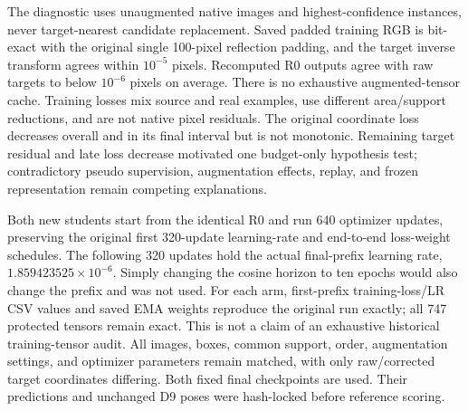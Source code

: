 The diagnostic uses unaugmented native images and highest-confidence instances, never target-nearest candidate replacement. Saved padded training RGB is bit-exact with the original single 100-pixel reflection padding, and the target inverse transform agrees within $10^{-5}$ pixels. Recomputed R0 outputs agree with raw targets to below $10^{-6}$ pixels on average. There is no exhaustive augmented-tensor cache. Training losses mix source and real examples, use different area/support reductions, and are not native pixel residuals. The original coordinate loss decreases overall and in its final interval but is not monotonic. Remaining target residual and late loss decrease motivated one budget-only hypothesis test; contradictory pseudo supervision, augmentation effects, replay, and frozen representation remain competing explanations.

Both new students start from the identical R0 and run 640 optimizer updates, preserving the original first 320-update learning-rate and end-to-end loss-weight schedules. The following 320 updates hold the actual final-prefix learning rate, $1.859423525\times10^{-6}$. Simply changing the cosine horizon to ten epochs would also change the prefix and was not used. For each arm, first-prefix training-loss/LR CSV values and saved EMA weights reproduce the original run exactly; all 747 protected tensors remain exact. This is not a claim of an exhaustive historical training-tensor audit. All images, boxes, common support, order, augmentation settings, and optimizer parameters remain matched, with only raw/corrected target coordinates differing. Both fixed final checkpoints are used. Their predictions and unchanged D9 poses were hash-locked before reference scoring.

\begin{table}[t]
\centering\small
\caption{Bounded post-hoc budget test, not a replacement for the 320-update main experiment. TRAIN residual is to the corrected pseudo target, not to real ground truth. Full-panel PCK10 retains all 985 supported corners.}
\label{tab:visiblebudget}
\end{table}

